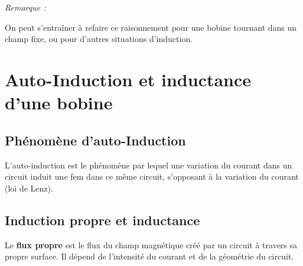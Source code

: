 \documentclass[french]{yLectureNote}
\renewcommand{\vec}{\overrightarrow}
\newcommand{\dd}{\mathrm{d}}
\newcommand{\E}{\vec{E}(M)}
\newcommand{\B}{\vec{B}(M)}
\begin{document}
\vspace{0.5em}
\textit{Remarque :}

On peut s'entraîner à refaire ce raisonnement pour une bobine tournant dans un champ fixe, ou pour d'autres situations d'induction.



\section{Auto-Induction et inductance d'une bobine}
\subsection{Phénomène d'auto-Induction}
\begin{definition}
    L'auto-induction est le phénomène par lequel une variation du courant dans un circuit induit une fem dans ce même circuit, s'opposant à la variation du courant (loi de Lenz).
\end{definition}
\subsection{Induction propre et inductance}
\begin{definition}
    Le \textbf{flux propre} est le flux du champ magnétique créé par un circuit à travers sa propre surface. Il dépend de l'intensité du courant et de la géométrie du circuit.
\end{definition}
\end{document}
